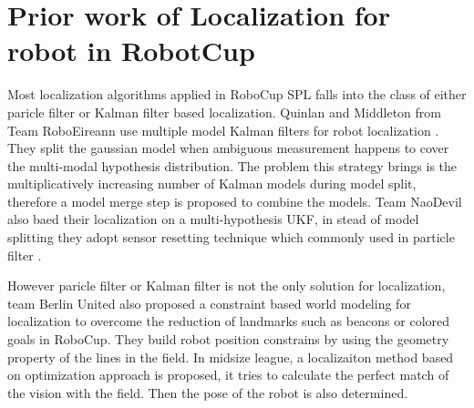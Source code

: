 \section{Prior work of Localization for robot in RobotCup}\label{sec:2.2}
Most localization algorithms applied in RoboCup \gls{SPL} falls into the class of either paricle filter or Kalman filter based localization. Quinlan and Middleton from Team RoboEireann use multiple model Kalman filters for robot localization \cite{Quinlan2010}. They split the gaussian model when ambiguous measurement happens to cover the multi-modal hypothesis distribution. The problem this strategy brings is the multiplicatively increasing number of Kalman models during model split, therefore a model merge step is proposed to combine the models. Team NaoDevil also baed their localization on a multi-hypothesis \gls{UKF}, in stead of model splitting they adopt sensor resetting technique which commonly used in particle filter \cite{Jochmann2012}. 

However paricle filter or Kalman filter is not the only solution for localization, team Berlin United also proposed a constraint based world modeling for localization \cite{Gohring2009} to overcome the reduction of landmarks such as beacons or colored goals in RoboCup. They build robot position constrains by using the geometry property of the lines in the field. In midsize league, a localizaiton method based on optimization approach \cite{Lauer2006} is proposed, it tries to calculate the perfect match of the vision with the field. Then the pose of the robot is also determined.

